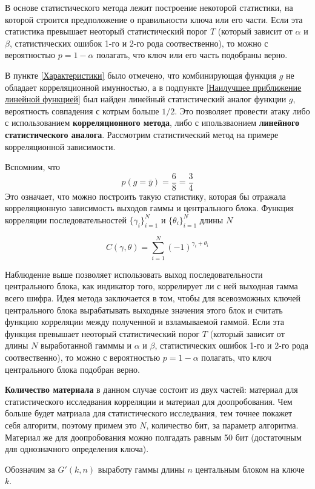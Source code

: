 \documentclass[a4paper,12pt]{article}
\theoremstyle{definition}
\begin{document}
	В основе статистического метода лежит построение некоторой статистики, на которой строится предположение о правильности ключа или его части. Если эта статистика превышает неоторый статистический порог $T$ (который зависит от $\alpha$ и $\beta$, статистических ошибок 1-го и 2-го рода соотвественно), то можно с вероятностью $p=1-\alpha$ полагать, что ключ или его часть подобраны верно.
	
	В пункте \ref{Характеристики} было отмечено, что комбинирующая функция $g$ не обладает корреляционной имунностью, а в подпункте \ref{Наилучшее приближение линейной функцией} был найден линейный статистический аналог функции $g$, вероятность совпадения с котрым больше $1/2$. Это позволяет провести атаку либо с использованием \textbf{корреляционного метода}, либо с ипользваонием \textbf{линейного статистического аналога}. Рассмотрим статистический метод на примере корреляционной зависимости.
	
	Вспомним, что 
	\[ p(g= \bar{y}) = \frac{6}{8} = \frac{3}{4} \]
	Это означает, что можно построить такую статистику, которая бы отражала корреляционную зависимость выходов гаммы и центрального блока. Функция корреляции последовательностей $\{\gamma_i\}_{i=1}^N$ и $\{\theta_i\}_{i=1}^N$ длины $N$
	
	\[  C(\gamma, \theta) = \sum_{i=1}^{N} \left(-1\right)^{\gamma_i +\theta_i} \]
	
	Наблюдение выше позволяет использовать выход последовательности центрального блока, как индикатор того, коррелирует ли с ней выходная гамма всего шифра. Идея метода заключается в том, чтобы для всевозможных ключей центрального блока вырабатывать выходные значения этого блок и считать функцию корреляции между полученной и взламываемой гаммой. Если эта функция превышает неоторый статистический порог $T$ (который зависит от длины $N$ выработанной гамммы и $\alpha$ и $\beta$, статистических ошибок 1-го и 2-го рода соотвественно), то можно с вероятностью $p=1-\alpha$ полагать, что ключ центрального блока подобран верно.

	\textbf{Количество материала} в данном случае состоит из двух частей: материал для статистического исследвания корреляции и материал для доопробования. Чем больше будет матриала для статистического исследвания, тем точнее покажет себя алгоритм, поэтому примем это $N$, количество бит, за параметр алгоритма. Материал же для доопробования можно полгадать равным 50 бит (достаточным для однозначного определения ключа).
	
	Обозначим за $G'(k, n)$ выработу гаммы длины $n$ центальным блоком на ключе $k$.
	
\end{document}
